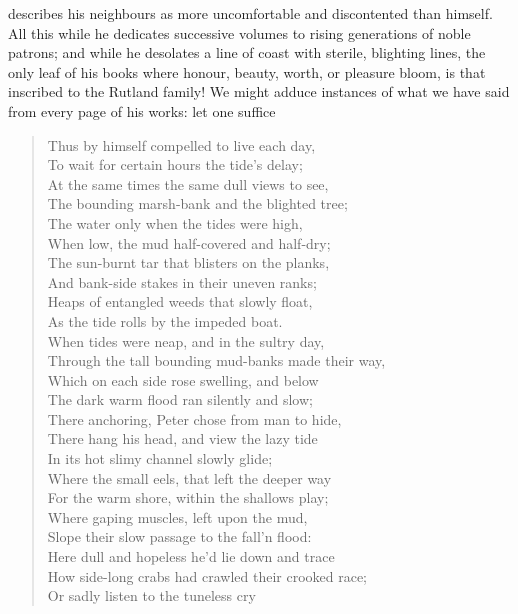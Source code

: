 describes his neighbours as more uncomfortable and discontented than
himself. All this while he dedicates successive volumes to rising
generations of noble patrons; and while he desolates a line of coast
with sterile, blighting lines, the only leaf of his books where honour,
beauty, worth, or pleasure bloom, is that inscribed to the Rutland
family! We might adduce instances of what we have said from every page
of his works: let one suffice\textemdash 
\begin{verse}
  Thus by himself compelled to live each day,\\
  To wait for certain hours the tide's delay;\\
  At the same times the same dull views to see,\\
  The bounding marsh-bank and the blighted tree;\\
  The water only when the tides were high,\\
  When low, the mud half-covered and half-dry;\\
  The sun-burnt tar that blisters on the planks,\\
  And bank-side stakes in their uneven ranks;\\
  Heaps of entangled weeds that slowly float,\\
  As the tide rolls by the impeded boat.\\
  When tides were neap, and in the sultry day,\\
  Through the tall bounding mud-banks made their way,\\
  Which on each side rose swelling, and below\\
  The dark warm flood ran silently and slow;\\
  There anchoring, Peter chose from man to hide,\\
  There hang his head, and view the lazy tide\\
  In its hot slimy channel slowly glide;\\
  Where the small eels, that left the deeper way\\
  For the warm shore, within the shallows play;\\
  Where gaping muscles, left upon the mud,\\
  Slope their slow passage to the fall'n flood:\\
  Here dull and hopeless he'd lie down and trace\\
  How side-long crabs had crawled their crooked race;\\
  Or sadly listen to the tuneless cry\\

\end{verse}
